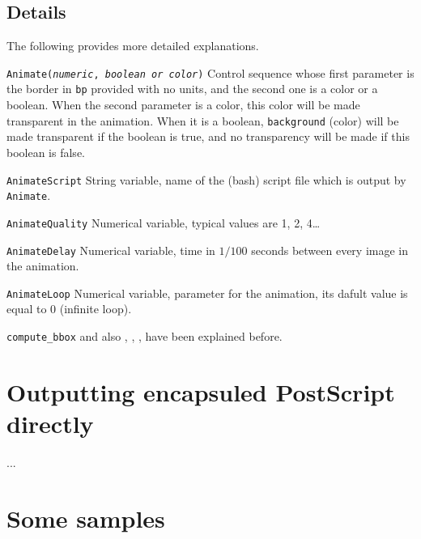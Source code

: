 \subsection{Details} The following provides more detailed explanations.


\item{\tt Animate({\it numeric}, {\it boolean or color})}
Control sequence whose first parameter is the border in {\tt bp} provided with no units, and the second one is a color or a boolean. When the second parameter is a color, this color will be made transparent in the animation. When it is a boolean, {\tt background} (color) will be made transparent if the boolean is true, and no transparency will be made if this boolean is false.


\item{\tt AnimateScript} String variable, name of the (bash) script file which is output by {\tt Animate}.

\item{\tt AnimateQuality} Numerical variable, typical values are 1, 2, 4\dots

\item{\tt AnimateDelay} Numerical variable, time in $1/100$ seconds between every image in the animation.

\item{\tt AnimateLoop} Numerical variable, parameter for the animation, its dafult value is equal to 0 (infinite loop).

\item{\tt compute\_bbox} and also , , ,  have been explained before.
\endlist

\section{Outputting encapsuled PostScript directly}


...


\section{Some samples}


